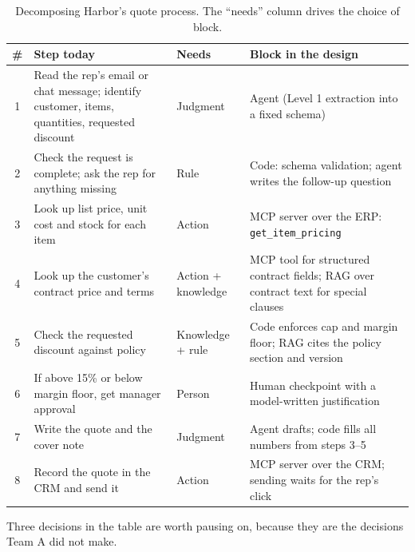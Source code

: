 \begin{table}[htbp]
\centering
\small
\caption{Decomposing Harbor's quote process. The ``needs'' column drives the choice of block.}
\label{tab:quote-decomp}
\begin{tabularx}{\textwidth}{@{}c>{\raggedright\arraybackslash}X>{\raggedright\arraybackslash}p{2.2cm}>{\raggedright\arraybackslash}X@{}}
\toprule
\# & Step today & Needs & Block in the design \\
\midrule
1 & Read the rep's email or chat message; identify customer, items, quantities, requested discount & Judgment & Agent (Level 1 extraction into a fixed schema) \\
2 & Check the request is complete; ask the rep for anything missing & Rule & Code: schema validation; agent writes the follow-up question \\
3 & Look up list price, unit cost and stock for each item & Action & MCP server over the ERP: \texttt{get\_item\_pricing} \\
4 & Look up the customer's contract price and terms & Action + knowledge & MCP tool for structured contract fields; RAG over contract text for special clauses \\
5 & Check the requested discount against policy & Knowledge + rule & Code enforces cap and margin floor; RAG cites the policy section and version \\
6 & If above 15\% or below margin floor, get manager approval & Person & Human checkpoint with a model-written justification \\
7 & Write the quote and the cover note & Judgment & Agent drafts; code fills all numbers from steps 3--5 \\
8 & Record the quote in the CRM and send it & Action & MCP server over the CRM; sending waits for the rep's click \\
\bottomrule
\end{tabularx}
\end{table}

Three decisions in the table are worth pausing on, because they are the decisions Team A did not make.

